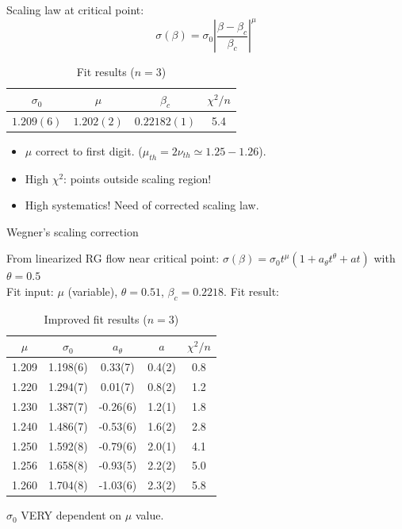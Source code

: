 \documentclass[12pt,handout]{beamer}
\begin{document}
\begin{frame}
\begin{center}
Scaling law at critical point:
\[
\sigma\left(\beta \right) = \sigma_0\left|\frac{\beta - \beta_c}{\beta_c} \right|^{\mu}
\]

\begin{table}[!htb]
\centering
\begin{tabular}{|c|c|c|c|}
\hline
$\sigma_0$ & $\mu$ & $\beta_c$ & $\chi^2 /n$\\
\hline
$1.209(6)$ & $1.202(2)$ & $0.22182(1)$ & 5.4\\
\hline
\end{tabular}
\caption{Fit results ($n = 3$)\label{tab:fitfinal}}
\end{table}

\begin{itemize}
\item $\mu$ correct to first digit. ($\mu_{th} = 2\nu_{th} \simeq 1.25-1.26$). %
\item High $\chi ^2$: points outside scaling region!
\item High systematics! Need of corrected scaling law.
\end{itemize}
\end{center}
\end{frame}

\begin{frame}{Wegner's scaling correction}
\begin{center}
From linearized RG flow near critical point:
$ \sigma\left( \beta \right) = \sigma _0 t^{\mu}\left( 1 + a_\theta t^{\theta} + a t\right)
$ with $\theta = 0.5$\\
\vspace{5pt}
Fit input: $\mu$ (variable), $\theta = 0.51$, $\beta_c = 0.2218$.
Fit result:
\begin{table}[!htb]
\centering
\begin{tabular}{|c|c|c|c|c|}
\hline
$\mu$ & $\sigma_0$ & $a_{\theta}$ & $a$ & $\chi^2/n$ \\
\hline
1.209 & 1.198(6) & 0.33(7) & 0.4(2) & 0.8\\
\hline
1.220 & 1.294(7) & 0.01(7) & 0.8(2) & 1.2\\
\hline
1.230 & 1.387(7) & -0.26(6) & 1.2(1) & 1.8\\
\hline
1.240 & 1.486(7) & -0.53(6) & 1.6(2) & 2.8\\
\hline
1.250 & 1.592(8) & -0.79(6) & 2.0(1) & 4.1\\
\hline
1.256 & 1.658(8) & -0.93(5) & 2.2(2) & 5.0\\
\hline
1.260 & 1.704(8) & -1.03(6) & 2.3(2) & 5.8\\
\hline

\end{tabular}
\caption{Improved fit results ($n=3$)\label{tab:fitfinalimproved}}
\end{table}
$\sigma_0$ VERY dependent on  $\mu$ value.
\end{center}
\end{frame}
\end{document}
